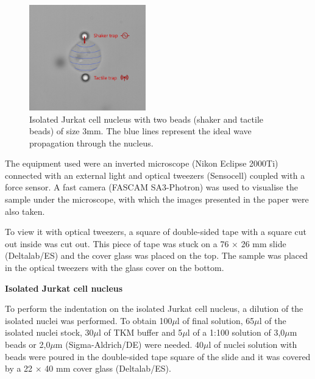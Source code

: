 \documentclass[12pt, a4paper]{article} %
\begin{document}
	\begin{figure}
		\centering
		\includegraphics[width=0.45\textwidth]{figures/jurkat_nucleus_waves.png}
		\caption{Isolated Jurkat cell nucleus with two beads (shaker and tactile beads) of size 3mm. The blue lines represent the ideal wave propagation through the nucleus.}
		\label{fig:myfig2}
	\end{figure}
	
	The equipment used were an inverted microscope (Nikon Eclipse 2000Ti) connected with an external light and optical tweezers (Sensocell) coupled with a force sensor. A fast camera (FASCAM SA3-Photron) was used to visualise the sample under the microscope, with which the images presented in the paper were also taken.
	
	\setlength{\parskip}{4mm}
	
	To view it with optical tweezers, a square of double-sided tape with a square cut out inside was cut out. This piece of tape was stuck on a 76 $\times$ 26 mm slide (Deltalab/ES) and the cover glass was placed on the top. The sample was placed in the optical tweezers with the glass cover on the bottom.
	
	\setlength{\parindent}{0pt}
	
	{\textbf{Isolated Jurkat cell nucleus}}
	
	To perform the indentation on the isolated Jurkat cell nucleus, a dilution of the isolated nuclei was performed. To obtain 100$\mu$l of final solution, 65$\mu$l of the isolated nuclei stock, 30$\mu$l of TKM buffer and 5$\mu$l of a 1:100 solution of 3,0$\mu$m beads or 2,0$\mu$m (Sigma-Aldrich/DE) were needed. 40$\mu$l of nuclei solution with beads were poured in the double-sided tape square of the slide and it was covered by a 22 $\times$ 40 mm cover glass (Deltalab/ES).
	
\end{document}

